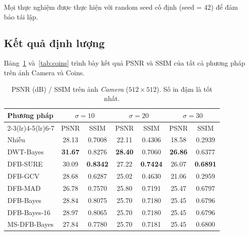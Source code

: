 Mọi thực nghiệm được thực hiện với random seed cố định (seed = 42) để đảm bảo tái lập.

\subsection{Kết quả định lượng}

Bảng~\ref{tab:camera} và~\ref{tab:coins} trình bày kết quả PSNR và SSIM của tất cả phương pháp trên ảnh Camera và Coins.

\begin{table}[H]
\centering
\caption{PSNR (dB) / SSIM trên ảnh \textit{Camera} ($512\times512$). Số in đậm là tốt nhất.}
\label{tab:camera}
\setlength{\tabcolsep}{6pt}
\begin{tabular}{@{}lcccccc@{}}
\toprule
\multirow{2}{*}{\textbf{Phương pháp}}
  & \multicolumn{2}{c}{$\sigma = 10$}
  & \multicolumn{2}{c}{$\sigma = 20$}
  & \multicolumn{2}{c}{$\sigma = 30$} \\
\cmidrule(lr){2-3}\cmidrule(lr){4-5}\cmidrule(lr){6-7}
  & PSNR & SSIM & PSNR & SSIM & PSNR & SSIM \\
\midrule
Nhiễu       & 28.13 & 0.7008 & 22.11 & 0.4306 & 18.58 & 0.2939 \\
DWT-Bayes   & \textbf{31.67} & 0.8276 & \textbf{28.40} & 0.7060 & \textbf{26.86} & 0.6377 \\
DFB-SURE    & 30.09 & \textbf{0.8342} & 27.22 & \textbf{0.7424} & 26.07 & \textbf{0.6891} \\
DFB-GCV     & 28.68 & 0.6287 & 25.02 & 0.4630 & 21.06 & 0.2959 \\
DFB-MAD     & 26.78 & 0.7570 & 25.80 & 0.7191 & 25.47 & 0.6797 \\
DFB-Bayes   & 28.84 & 0.8075 & 25.70 & 0.7180 & 25.45 & 0.6796 \\
DFB-Bayes-16  & 28.97 & 0.8065 & 25.70 & 0.7180 & 25.45 & 0.6796 \\
MS-DFB-Bayes  & 27.84 & 0.7780 & 25.70 & 0.7181 & 25.45 & 0.6800 \\
\bottomrule
\end{tabular}
\end{table}

